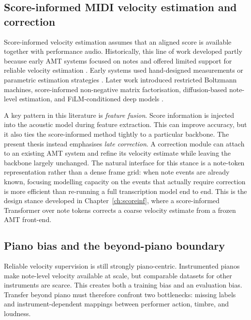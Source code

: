 \subsection{Score-informed MIDI velocity estimation and correction}
\label{sec:bg:velocity:scoreinf}

Score-informed velocity estimation assumes that an aligned score is available together with performance audio. Historically, this line of work developed partly because early AMT systems focused on notes and offered limited support for reliable velocity estimation \cite{amt2013ov}. Early systems used hand-designed measurements or parametric estimation strategies \cite{dan2006psy,goebl2003role,szeto2005finding,ewert2011est}. Later work introduced restricted Boltzmann machines, score-informed non-negative matrix factorisation, diffusion-based note-level estimation, and FiLM-conditioned deep models \cite{van2014pred,jeong2017note,jeong2018timbre,kim2023diffvel,kim2023score,kim2024method,simonetta2022acoustics}.

A key pattern in this literature is \emph{feature fusion}. Score information is injected into the acoustic model during feature extraction. This can improve accuracy, but it also ties the score-informed method tightly to a particular backbone. The present thesis instead emphasises \emph{late correction}. A correction module can attach to an existing AMT system and refine its velocity estimate while leaving the backbone largely unchanged. The natural interface for this stance is a note-token representation rather than a dense frame grid: when note events are already known, focusing modelling capacity on the events that actually require correction is more efficient than re-running a full transcription model end to end. This is the design stance developed in Chapter~\ref{ch:scoreinf}, where a score-informed Transformer over note tokens corrects a coarse velocity estimate from a frozen AMT front-end.

\subsection{Piano bias and the beyond-piano boundary}
\label{sec:bg:velocity:beyond}

Reliable velocity supervision is still strongly piano-centric. Instrumented pianos make note-level velocity available at scale, but comparable datasets for other instruments are scarce. This creates both a training bias and an evaluation bias. Transfer beyond piano must therefore confront two bottlenecks: missing labels and instrument-dependent mappings between performer action, timbre, and loudness.

